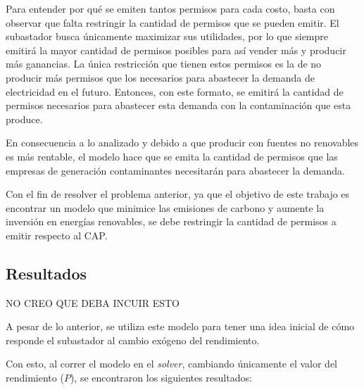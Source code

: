 Para entender por qué se emiten tantos permisos para cada costo, basta con observar que falta restringir la cantidad de permisos que se pueden emitir. El subastador busca únicamente maximizar sus utilidades, por lo que siempre emitirá la mayor cantidad de permisos posibles para así vender más y producir más ganancias. La única restricción que tienen estos permisos es la de no producir más permisos que los necesarios para abastecer la demanda de electricidad en el futuro. Entonces, con este formato, se emitirá la cantidad de permisos necesarios para abastecer esta demanda con la contaminación que esta produce.
\vspace{2.5mm}

En consecuencia a lo analizado y debido a que producir con fuentes no renovables es más rentable, el modelo hace que se emita la cantidad de permisos que las empresas de generación contaminantes necesitarán para abastecer la demanda. 
\vspace{2.5mm}

Con el fin de resolver el problema anterior, ya que el objetivo de este trabajo es encontrar un modelo que minimice las emisiones de carbono y aumente la inversión en energías renovables, se debe restringir la cantidad de permisos a emitir respecto al CAP.


\subsection{Resultados}

NO CREO QUE DEBA INCUIR ESTO 

A pesar de lo anterior, se utiliza este modelo para tener una idea inicial de cómo responde el subastador al cambio exógeno del rendimiento.

Con esto, al correr el modelo en el \textit{solver}, cambiando únicamente el valor del rendimiento ($P$), se encontraron los siguientes resultados:

